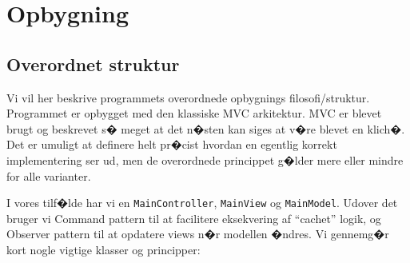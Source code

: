 \documentclass[danish]{article}
\newcommand{\code}[1]{\texttt{#1}}
\begin{document}
\section*{Opbygning}
\subsection{Overordnet struktur}
Vi vil her beskrive programmets overordnede opbygnings filosofi/struktur. Programmet er opbygget med
den klassiske MVC arkitektur. MVC er blevet brugt og beskrevet s� meget at det n�sten kan siges at
v�re blevet en klich�. Det er umuligt at definere helt pr�cist hvordan en egentlig korrekt
implementering ser ud, men de overordnede princippet g�lder mere eller mindre for alle varianter.

I vores tilf�lde har vi en \code{MainController}, \code{MainView} og \code{MainModel}. Udover det
bruger vi Command pattern til at facilitere eksekvering af ``cachet'' logik, og Observer pattern til
at opdatere views n�r modellen �ndres. Vi gennemg�r kort nogle vigtige klasser og principper:
\end{document}
